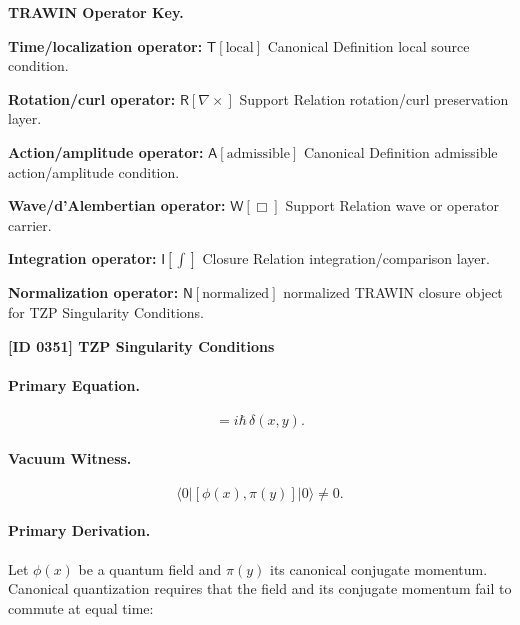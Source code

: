 \par\vspace{0.45\baselineskip}
\noindent\begin{minipage}[t]{\linewidth}
\begingroup
\small
\raggedright
\textbf{TRAWIN Operator Key.}\par
\noindent\textbf{Time/localization operator:} $\mathsf{T}\!\left[\mathrm{local}\right]$ Canonical Definition local source condition.\par
\noindent\textbf{Rotation/curl operator:} $\mathsf{R}\!\left[\nabla\times\right]$ Support Relation rotation/curl preservation layer.\par
\noindent\textbf{Action/amplitude operator:} $\mathsf{A}\!\left[\mathrm{admissible}\right]$ Canonical Definition admissible action/amplitude condition.\par
\noindent\textbf{Wave/d'Alembertian operator:} $\mathsf{W}\!\left[\Box\right]$ Support Relation wave or operator carrier.\par
\noindent\textbf{Integration operator:} $\mathsf{I}\!\left[\int\right]$ Closure Relation integration/comparison layer.\par
\noindent\textbf{Normalization operator:} $\mathsf{N}\!\left[\mathrm{normalized}\right]$ normalized TRAWIN closure object for TZP Singularity Conditions.\par
\endgroup
\end{minipage}

\clearpage
\noindent\textbf{[ID 0351] TZP Singularity Conditions}\par
\vspace{0.35em}
\paragraph{Primary Equation.}
\begin{equation}
[\phi(x),\pi(y)] = i\hbar\,\delta(x,y).
\end{equation}

\paragraph{Vacuum Witness.}
\begin{equation}
\langle 0|[\phi(x),\pi(y)]|0\rangle \neq 0 .
\end{equation}

\paragraph{Primary Derivation.}
Let $\phi(x)$ be a quantum field and $\pi(y)$ its canonical conjugate momentum.  
Canonical quantization requires that the field and its conjugate momentum fail to commute at equal time:

